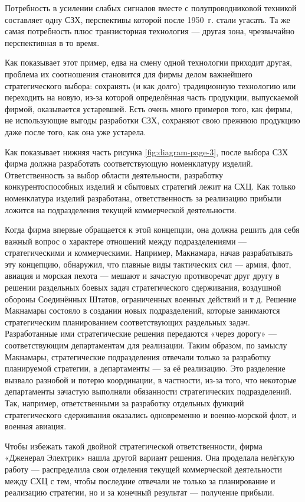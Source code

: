 Потребность в усилении слабых сигналов вместе с полупроводниковой техникой составляет одну СЗХ, перспективы которой после 1950 г. стали угасать. Та же самая потребность плюс транзисторная технология — другая зона, чрезвычайно перспективная в то время.

Как показывает этот пример, едва на смену одной технологии приходит другая, проблема их соотношения становится для фирмы делом важнейшего стратегического выбора: сохранять (и как долго) традиционную технологию или переходить на новую, из-за которой определённая часть продукции, выпускаемой фирмой, оказывается устаревшей. Есть очень много примеров того, как фирмы, не использующие выгоды разработки СЗХ, сохраняют свою прежнюю продукцию даже после того, как она уже устарела.

Как показывает нижняя часть рисунка \ref{fig:diagram-page-3}, после выбора СЗХ фирма должна разработать соответствующую номенклатуру изделий. Ответственность за выбор области деятельности, разработку конкурентоспособных изделий и сбытовых стратегий лежит на СХЦ. Как только номенклатура изделий разработана, ответственность за реализацию прибыли ложится на подразделения текущей коммерческой деятельности.

Когда фирма впервые обращается к этой концепции, она должна решить для себя важный вопрос о характере отношений между подразделениями — стратегическими и коммерческими. Например, Макнамара, начав разрабатывать эту концепцию, обнаружил, что главные виды тактических сил — армия, флот, авиация и морская пехота — мешают и зачастую противоречат друг другу в решении раздельных боевых задач стратегического сдерживания, воздушной обороны Соединённых Штатов, ограниченных военных действий и т д. Решение Макнамары состояло в создании новых подразделений, которые занимаются стратегическим планированием соответствующих раздельных задач. Разработанные ими стратегические решения передаются «через дорогу» — соответствующим департаментам для реализации. Таким образом, по замыслу Макнамары, стратегические подразделения отвечали только за разработку планируемой стратегии, а департаменты — за её реализацию. Это разделение вызвало разнобой и потерю координации, в частности, из-за того, что некоторые департаменты зачастую выполняли обязанности стратегических подразделений. Так, например, ответственными за разработку отдельных функций стратегического сдерживания оказались одновременно и военно-морской флот, и военная авиация.

Чтобы избежать такой двойной стратегической ответственности, фирма «Дженерал Электрик» нашла другой вариант решения. Она проделала нелёгкую работу — распределила свои отделения текущей коммерческой деятельности между СХЦ с тем, чтобы последние отвечали не только за планирование и реализацию стратегии, но и за конечный результат — получение прибыли.

